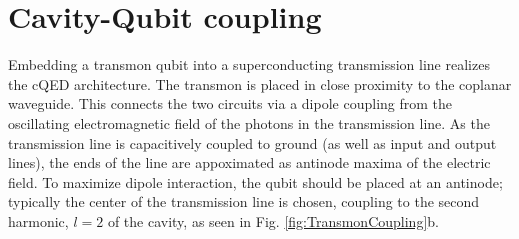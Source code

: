\documentclass[11 pt, oneside]{book} %
\begin{document}


\section{Cavity-Qubit coupling}
Embedding a transmon qubit into a superconducting transmission line realizes the cQED architecture. The transmon is placed in close proximity to the coplanar waveguide. This connects the two circuits via a dipole coupling from the oscillating electromagnetic field of the photons in the transmission line. As the transmission line is capacitively coupled to ground (as well as input and output lines), the ends of the line are appoximated as antinode maxima of the electric field. To maximize dipole interaction, the qubit should be placed at an antinode; typically the center of the transmission line is chosen, coupling to the second harmonic, $l=2$ of the cavity, as seen in Fig. \ref{fig:TransmonCoupling}b. 
\end{document}
